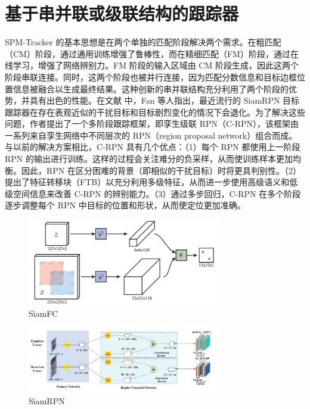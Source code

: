 \section{基于串并联或级联结构的跟踪器}
SPM-Tracker \cite{SPM} 的基本思想是在两个单独的匹配阶段解决两个需求。在粗匹配（CM）阶段，通过通用训练增强了鲁棒性，而在精细匹配（FM）阶段，通过在线学习，增强了网络辨别力。FM 阶段的输入区域由 CM 阶段生成，因此这两个阶段串联连接。同时，这两个阶段也被并行连接，因为匹配分数信息和目标边框位置信息被融合以生成最终结果。这种创新的串并联结构充分利用了两个阶段的优势，并具有出色的性能。在文献 \cite{fan2019siamese} 中，Fan 等人指出，最近流行的 SiamRPN \cite{SiamRPN} 目标跟踪器在存在表观近似的干扰目标和目标剧烈变化的情况下会退化。为了解决这些问题，作者提出了一个多阶段跟踪框架，即孪生级联 RPN（C-RPN），该框架由一系列来自孪生网络中不同层次的 RPN（region proposal network）组合而成。与以前的解决方案相比，C-RPN 具有几个优点：（1）每个 RPN 都使用上一阶段 RPN 的输出进行训练。这样的过程会关注难分的负采样，从而使训练样本更加均衡。因此，RPN 在区分困难的背景（即相似的干扰目标）时将更具判别性。（2）提出了特征转移块（FTB）以充分利用多级特征，从而进一步使用高级语义和低级空间信息来改善 C-RPN 的辨别能力。（3）通过多步回归，C-RPN 在多个阶段逐步调整每个 RPN 中目标的位置和形状，从而使定位更加准确。
\iffalse
\begin{figure}
\centering
\includegraphics[width=0.75\textwidth]{Img/related/SiamFC.png}
\caption{SiamFC}
\end{figure}

\begin{figure}
\centering
\includegraphics[width=0.75\textwidth]{Img/related/SiamRPN.png}
\caption{SiamRPN}
\end{figure}

